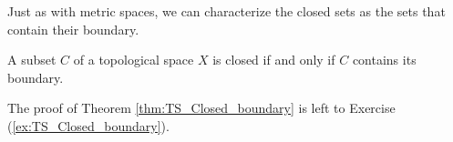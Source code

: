\begin{comment}

\ActivitySolution

\ba
\item  Neither $a$ nor $b$ is a boundary point of $\{c,d\}$ since the open neighborhood $\{a,b\}$ contains no point in $\{c,d\}$. The only open set that contains $c$ or $d$ is $X$, so that is the only neighborhood of $c$ or $d$. Since $X$ contains a point in $\{c,d\}$ that is different than $c$ (or $d$), and a point not in $\{c,d\}$, both $c$ and $d$ are boundary points of $\{c,d\}$. Therefore, $\Bdry(\{c,d\}) = \{c,d\}$. 

\item  None of the points $d$, $e$, or $f$ is a boundary point of $\{a,b\}$ since the open neighborhood $\{d,e,f\}$ contains no point in $\{a,b\}$. The open neighborhood $\{b\}$ of $b$ contains no points that are not in $\{a,b\}$, so $b$ is not a boundary point of $\{a,b\}$. Any neighborhood of $a$ or $c$ must contain one of the open sets $\{a,b,c\}$ or $X$. So every neighborhood of $a$ or $c$ contains a point of $\{a,b\}$ and a point not in $\{a,b\}$. So $a$ and $c$ are boundary points of $\{a,b\}$. Therefore, $\Bdry(\{a,b\}) = \{a,c\}$.  

\item Since $\{a\}$, $\{b\}$, and $\{c\}$ are open sets, and none of these sets contain points in both $A$ and $X \setminus A$, the boundary of $A$ is empty. 

\item Let $x \in \R$ and let $O$ be an open set containing $x$. Since $\R \setminus O$ is finite, there must be infinitely many points in both $\Z$ and $\R$ that are not in $\R \setminus O$. So $O$ contains infinitely many integers and real numbers. It follows that every point in $\Z$ is a boundary point and $\Bdry(\Z) = \R$. 

\ea

\end{comment}

Just as with metric spaces, we can characterize the closed sets as the sets that contain their boundary.

\begin{theorem} \label{thm:TS_Closed_boundary} A subset $C$ of a topological space $X$ is closed if and only if $C$ contains its boundary. 
\end{theorem}

The proof of Theorem \ref{thm:TS_Closed_boundary} is left to Exercise (\ref{ex:TS_Closed_boundary}).

